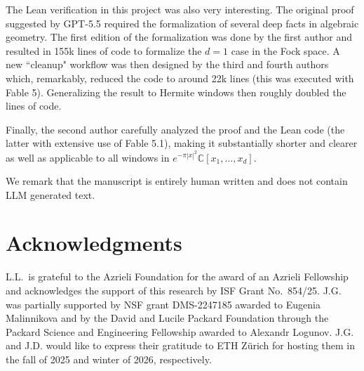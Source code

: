 \documentclass[11pt]{amsart}
\begin{document}
The Lean verification in this project was also very interesting. The original proof suggested by GPT-5.5 required the formalization of several deep facts in algebraic geometry. The first edition of the formalization was done by the first author and resulted in 155k lines of code to formalize the $d=1$ case in the Fock space. A new ``cleanup" workflow was then designed by the third and fourth authors which, remarkably, reduced the code to around 22k lines (this was executed with Fable 5). Generalizing the result to Hermite windows then roughly doubled the lines of code.

Finally, the second author carefully analyzed the proof and the Lean code (the latter with extensive use of Fable 5.1), making it substantially shorter and clearer as well as applicable to all windows in $e^{-\pi |x|^2} \mathbb C[x_1,\ldots,x_d]$.

We remark that the manuscript is entirely human written and does not contain LLM generated text.

\section*{Acknowledgments}

L.L.~is grateful to the Azrieli Foundation for the award of an Azrieli Fellowship and acknowledges the support of this research by ISF Grant No.~854/25. J.G. was partially supported by NSF grant DMS-2247185 awarded to Eugenia Malinnikova and by the David and Lucile Packard Foundation through the Packard Science and Engineering Fellowship awarded to Alexandr Logunov. J.G. and J.D. would like to express their gratitude to ETH Z\"urich for hosting them in the fall of 2025 and winter of 2026, respectively.

\printbibliography
\end{document}
